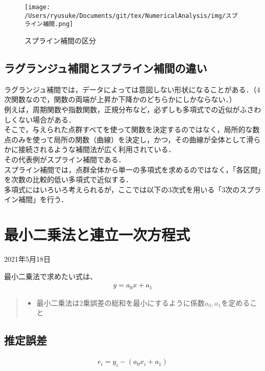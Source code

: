 \documentclass[dvipdfmx,uplatex]{jsarticle}
\begin{document}
\begin{spacing}{1.4}
\begin{figure}[htbp]
\begin{center}
\texttt{[image: /Users/ryusuke/Documents/git/tex/NumericalAnalysis/img/スプライン補間.png]}
\caption{スプライン補間の区分}
\end{center}
\end{figure}

\subsection{ラグランジュ補間とスプライン補間の違い}
ラグランジュ補間では，データによっては意図しない形状になることがある．（4次関数なので，関数の両端が上昇か下降かのどちらかにしかならない．）\\
例えば，周期関数や指数関数，正規分布など，必ずしも多項式での近似がふさわしくない場合がある．\\
そこで，与えられた点群すべてを使って関数を決定するのではなく，局所的な数点のみを使って局所の関数（曲線）を決定し，かつ，その曲線が全体として滑らかに接続されるような補間法が広く利用されている．\\
その代表例がスプライン補間である．\\
スプライン補間では，点群全体から単一の多項式を求めるのではなく，「各区間」を次数の比較的低い多項式で近似する．\\
多項式にはいろいろ考えられるが，ここでは以下の3次式を用いる「3次のスプライン補間」を行う．

\newpage

\section{最小二乗法と連立一次方程式}
\begin{center}
  2021年5月18日 \\
\end{center}
最小二乗法で求めたい式は、
\begin{eqnarray}
  y = a_0x + a_1
\end{eqnarray}

\begin{quote}
 \begin{itemize}
  \item 最小二乗法は2乗誤差の総和を最小にするように係数$a_0, a_1$を定めること
 \end{itemize}
\end{quote}

\subsection{推定誤差}
\begin{eqnarray}
  e_i = y_i - (a_0x_i + a_1)
\end{eqnarray}


\end{spacing}
\end{document}
